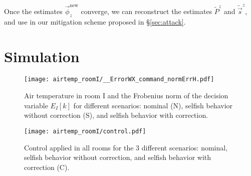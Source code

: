 \documentclass{ifacconf}  %
\begin{document}
Once the estimates $\vec{\phi}_{z}^{\mathrm{new}}$ converge, we can reconstruct the estimates $\tilde{P}^{z}$ and $\tilde{\vec{s}}^{z}$, and use in our mitigation scheme proposed in \S\ref{sec:attack}.





\section{Simulation}
\begin{figure}[h]
  \centering
 \texttt{[image: airtemp\_roomI/\_\_ErrorWX\_command\_normErrH.pdf]}
  \caption{Air temperature in room I and the Frobenius norm of the decision variable $E_{I}[k]$ for different scenarios: nominal (N), selfish behavior without correction (S),
and selfish behavior with correction.}\label{fig:response3Scenarios}
\end{figure}
\begin{figure}[h]
  \centering
 \texttt{[image: airtemp\_roomI/control.pdf]}
  \caption{Control applied in all rooms for the 3 different scenarios: nominal, selfish behavior without correction, and selfish behavior with correction (C).}\label{fig:response3Scenarios}
\end{figure}
\end{document}
